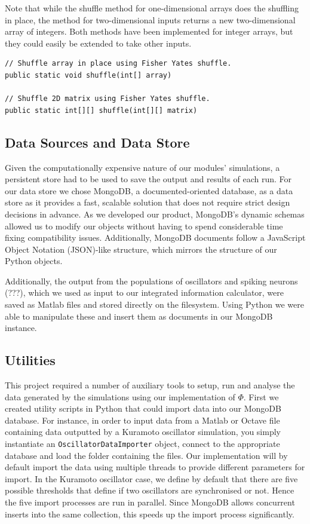 \documentclass[a4paper,11pt]{article}
\begin{document}
Note that while the shuffle method for one-dimensional arrays does the shuffling in place, the method for two-dimensional inputs returns a new two-dimensional array of integers. Both methods have been implemented for integer arrays, but they could easily be extended to take other inputs. 

\begin{verbatim}
// Shuffle array in place using Fisher Yates shuffle.
public static void shuffle(int[] array)

// Shuffle 2D matrix using Fisher Yates shuffle.
public static int[][] shuffle(int[][] matrix)
\end{verbatim}

\subsection{Data Sources and Data Store}

Given the computationally expensive nature of our modules' simulations, a persistent store had to be used to save the output and results of each run. For our data store we chose MongoDB, a documented-oriented database, as a data store as it provides a fast, scalable solution that does not require strict design decisions in advance. As we developed our product, MongoDB's dynamic schemas allowed us to modify our objects without having to spend considerable time fixing compatibility issues. Additionally, MongoDB documents follow a JavaScript Object Notation (JSON)-like structure, which mirrors the structure of our Python objects.

Additionally, the output from the populations of oscillators and spiking neurons (???), which we used as input to our integrated information calculator, were saved as Matlab files and stored directly on the filesystem. Using Python we were able to manipulate these and insert them as documents in our MongoDB instance. 

\subsection{Utilities}
\label{sec:utils}
This project required a number of auxiliary tools to setup, run and analyse the data generated by the simulations using our implementation of $\Phi$. First we created utility scripts in Python that could import data into our MongoDB database. For instance, in order to input data from a Matlab or Octave file containing data outputted by a Kuramoto oscillator simulation, you simply instantiate an \texttt{OscillatorDataImporter} object, connect to the appropriate database and load the folder containing the files. Our implementation will by default import the data using multiple threads to provide different parameters for import. In the Kuramoto oscillator case, we define by default that there are five possible thresholds that define if two oscillators are synchronised or not. Hence the five import processes are run in parallel. Since MongoDB allows concurrent inserts into the same collection, this speeds up the import process significantly.
\end{document}
